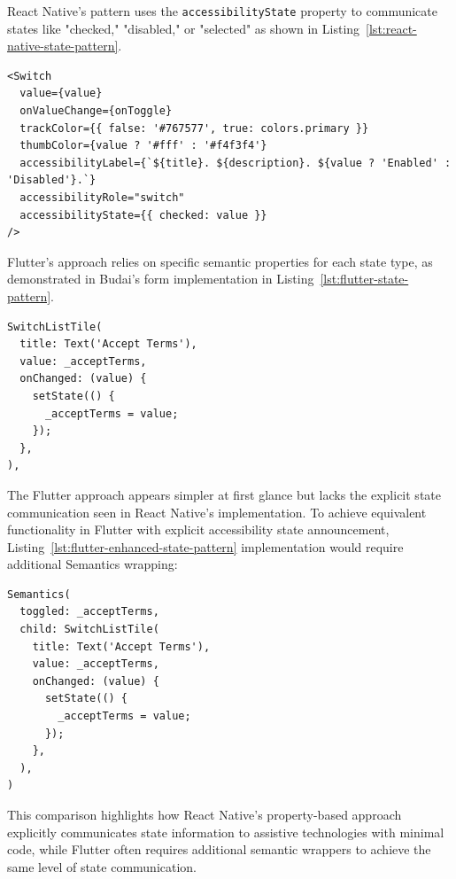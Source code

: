 React Native's pattern uses the \texttt{accessibilityState} property to communicate states like "checked," "disabled," or "selected" as shown in Listing~\ref{lst:react-native-state-pattern}.

\begin{lstlisting}[style=ReactNativeStyle, caption=State communication in React Native, label=lst:react-native-state-pattern]
<Switch
  value={value}
  onValueChange={onToggle}
  trackColor={{ false: '#767577', true: colors.primary }}
  thumbColor={value ? '#fff' : '#f4f3f4'}
  accessibilityLabel={`${title}. ${description}. ${value ? 'Enabled' : 'Disabled'}.`}
  accessibilityRole="switch"
  accessibilityState={{ checked: value }}
/>
\end{lstlisting}

\FloatBarrier

Flutter's approach relies on specific semantic properties for each state type, as demonstrated in Budai's form implementation in Listing~\ref{lst:flutter-state-pattern}.

\begin{lstlisting}[style=DartStyle, caption=State communication in Flutter, label=lst:flutter-state-pattern]
SwitchListTile(
  title: Text('Accept Terms'),
  value: _acceptTerms,
  onChanged: (value) {
    setState(() {
      _acceptTerms = value;
    });
  },
),
\end{lstlisting}

\FloatBarrier

The Flutter approach appears simpler at first glance but lacks the explicit state communication seen in React Native's implementation. To achieve equivalent functionality in Flutter with explicit accessibility state announcement, Listing~\ref{lst:flutter-enhanced-state-pattern} implementation would require additional Semantics wrapping:

\begin{lstlisting}[style=DartStyle, caption=Enhanced state communication in Flutter, label=lst:flutter-enhanced-state-pattern]
Semantics(
  toggled: _acceptTerms,
  child: SwitchListTile(
    title: Text('Accept Terms'),
    value: _acceptTerms,
    onChanged: (value) {
      setState(() {
        _acceptTerms = value;
      });
    },
  ),
)
\end{lstlisting}

This comparison highlights how React Native's property-based approach explicitly communicates state information to assistive technologies with minimal code, while Flutter often requires additional semantic wrappers to achieve the same level of state communication.

